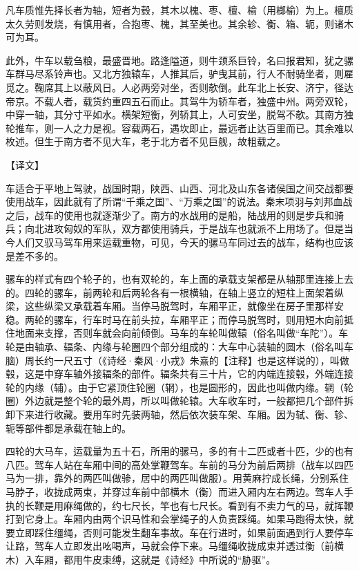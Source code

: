 \documentclass[12pt,UTF8]{ctexbook}
\begin{document}
凡车质惟先择长者为轴，短者为毂，其木以槐、枣、檀、榆（用榔榆）为上。檀质太久劳则发烧，有慎用者，合抱枣、槐，其至美也。其余轸、衡、箱、轭，则诸木可为耳。

此外，牛车以载刍粮，最盛晋地。路逢隘道，则牛颈系巨铃，名曰报君知，犹之骡车群马尽系铃声也。又北方独辕车，人推其后，驴曳其前，行人不耐骑坐者，则雇觅之。鞠席其上以蔽风日。人必两旁对坐，否则欹倒。此车北上长安、济宁，径达帝京。不载人者，载货约重四五石而止。其驾牛为轿车者，独盛中州。两旁双轮，中穿一轴，其分寸平如水。横架短衡，列轿其上，人可安坐，脱驾不欹。其南方独轮推车，则一人之力是视。容载两石，遇坎即止，最远者止达百里而已。其余难以枚述。但生于南方者不见大车，老于北方者不见巨舰，故粗载之。

【译文】

车适合于平地上驾驶，战国时期，陕西、山西、河北及山东各诸侯国之间交战都要使用战车，因此就有了所谓“千乘之国”、“万乘之国”的说法。秦末项羽与刘邦血战之后，战车的使用也就逐渐少了。南方的水战用的是船，陆战用的则是步兵和骑兵；向北进攻匈奴的军队，双方都使用骑兵，于是战车也就派不上用场了。但是当今人们又驭马驾车用来运载重物，可见，今天的骡马车同过去的战车，结构也应该是差不多的。

骡车的样式有四个轮子的，也有双轮的，车上面的承载支架都是从轴那里连接上去的。四轮的骡车，前两轮和后两轮各有一根横轴，在轴上竖立的短柱上面架着纵梁，这些纵梁又承载着车厢。当停马脱驾时，车厢平正，就像坐在房子里那样安稳。两轮的骡车，行车时马在前头拉，车厢平正；而停马脱驾时，则用短木向前抵住地面来支撑，否则车就会向前倾倒。马车的车轮叫做辕（俗名叫做“车陀”）。车轮是由轴承、辐条、内缘与轮圈四个部分组成的：大车中心装轴的圆木（俗名叫车脑）周长约一尺五寸（《诗经·秦风·小戎》朱熹的【注释】也是这样说的），叫做毂，这是中穿车轴外接辐条的部件。辐条共有三十片，它的内端连接毂，外端连接轮的内缘（辅）。由于它紧顶住轮圈（辋），也是圆形的，因此也叫做内缘。辋（轮圈）外边就是整个轮的最外周，所以叫做轮辕。大车收车时，一般都把几个部件拆卸下来进行收藏。要用车时先装两轴，然后依次装车架、车厢。因为轼、衡、轸、轭等部件都是承载在轴上的。

四轮的大马车，运载量为五十石，所用的骡马，多的有十二匹或者十匹，少的也有八匹。驾车人站在车厢中间的高处掌鞭驾车。车前的马分为前后两排（战车以四匹马为一排，靠外的两匹叫做骖，居中的两匹叫做服）。用黄麻拧成长绳，分别系住马脖子，收拢成两束，并穿过车前中部横木（衡）而进入厢内左右两边。驾车人手执的长鞭是用麻绳做的，约七尺长，竿也有七尺长。看到有不卖力气的马，就挥鞭打到它身上。车厢内由两个识马性和会掌绳子的人负责踩绳。如果马跑得太快，就要立即踩住缰绳，否则可能发生翻车事故。车在行进时，如果前面遇到行人要停车让路，驾车人立即发出吆喝声，马就会停下来。马缰绳收拢成束并透过衡（前横木）入车厢，都用牛皮束缚，这就是《诗经》中所说的“胁驱”。
\end{document}
